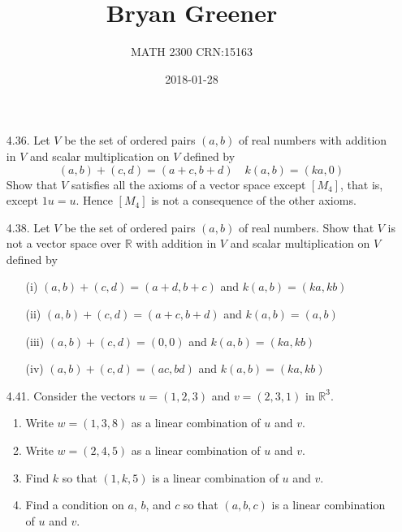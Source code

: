 \documentclass[12pt]{article}
\title{Bryan Greener}
\author{MATH 2300 CRN:15163}
\date{2018-01-28}
\begin{document}
\maketitle

\TabPositions{4cm}

\begin{enumerate}
\item[4.36.] Let $V$ be the set of ordered pairs $(a,b)$ of real numbers with addition in $V$ and scalar multiplication on $V$ defined by
			\[ (a,b) + (c,d) = (a+c,b+d) \quad k(a,b) = (ka,0) \]
			Show that $V$ satisfies all the axioms of a vector space except $[M_4]$, that is, except $1u=u$. Hence $[M_4]$ is not a consequence of the other axioms.
			
\item[4.38.] Let $V$ be the set of ordered pairs $(a,b)$ of real numbers. Show that $V$ is not a vector space over $\mathbb{R}$ with addition in $V$ and scalar multiplication on $V$ defined by
	\begin{enumerate}
	\item[(i)] $(a,b)+(c,d)=(a+d,b+c)$ and $k(a,b)=(ka,kb)$

	\item[(ii)] $(a,b)+(c,d)=(a+c,b+d)$ and $k(a,b)=(a,b)$

	\item[(iii)] $(a,b)+(c,d)=(0,0)$ and $k(a,b)=(ka,kb)$
	
	\item[(iv)] $(a,b)+(c,d)=(ac,bd)$ and $k(a,b)=(ka,kb)$
	\end{enumerate}
	
\item[4.41.] Consider the vectors $u=(1,2,3)$ and $v=(2,3,1)$ in $\mathbb{R}^3$.
	\begin{enumerate}
	\item Write $w=(1,3,8)$ as a linear combination of $u$ and $v$.

	\item Write $w=(2,4,5)$ as a linear combination of $u$ and $v$.

	\item Find $k$ so that $(1,k,5)$ is a linear combination of $u$ and $v$.

	\item Find a condition on $a$, $b$, and $c$ so that $(a,b,c)$ is a linear combination of $u$ and $v$.
	\end{enumerate}
	

\end{enumerate}
\end{document}
